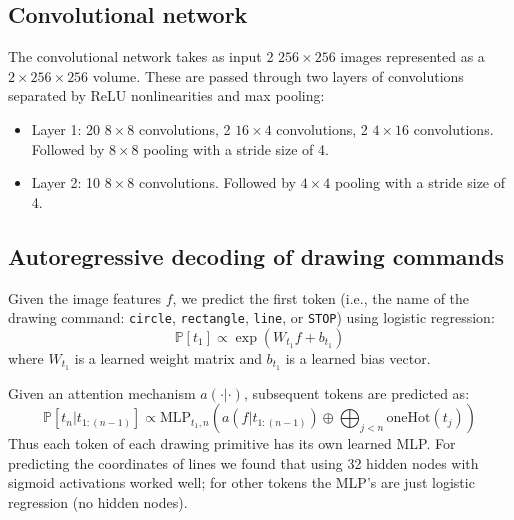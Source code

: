 \documentclass{article}
\newcommand{\probability}{\mathds{P}} %
\begin{document}
\subsection{Convolutional network}\label{CNNarchitecture}
The convolutional network takes as input 2 $256\times 256$ images
represented as a $2\times 256\times 256$ volume. These are
passed through two layers of convolutions separated by ReLU
nonlinearities and max pooling:
\begin{itemize}
\item Layer 1: 20 $8\times 8$ convolutions, 2 $16\times 4$ convolutions, 2 $4\times 16$ convolutions. Followed by $8\times 8$ pooling with a stride size of 4.
\item Layer 2: 10 $8\times 8$ convolutions. Followed by $4\times 4$ pooling with a stride size of 4.
\end{itemize}


\subsection{Autoregressive decoding of drawing commands}

Given the image features $f$, we predict the first token (i.e., the name of the drawing command: \verb|circle|, \verb|rectangle|, \verb|line|, or \verb|STOP|) using logistic regression:
\begin{equation}
  \probability [t_1]\propto \exp\left( W_{t_1}f + b_{t_1}\right)
\end{equation}
where $W_{t_1}$ is a learned weight matrix and  $b_{t_1}$ is a learned bias vector.

Given an attention mechanism $a(\cdot | \cdot)$, subsequent tokens are predicted as:
\begin{equation}
  \probability [t_n|t_{1:(n - 1)}]\propto \text{MLP}_{t_1,n}(a(f|t_{1:(n - 1)}) \oplus \bigoplus_{j < n} \text{oneHot}(t_j))\label{discreteTokenPrediction}
\end{equation}
Thus each token of each drawing primitive has its own learned MLP.
For predicting the coordinates of lines we found that using 32 hidden nodes with sigmoid activations worked well;
for other tokens the MLP's are just logistic regression (no hidden nodes).
\end{document}
